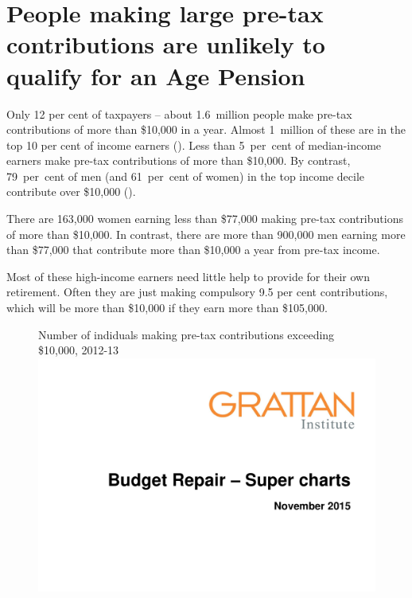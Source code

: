 \section{People making large pre-tax contributions are unlikely to qualify for an Age Pension}
Only 12 per cent of taxpayers – about 1.6~million people make pre-tax contributions of more than \$10,000 in a year. Almost 1~million of these are in the top 10 per cent of income earners (). Less than 5~per~cent of median-income earners make pre-tax contributions of more than \$10,000. By contrast, 79~per~cent of men (and 61~per~cent of women) in the top income decile contribute over \$10,000 (). 

There are 163,000 women earning less than \$77,000 making pre-tax contributions of more than \$10,000. In contrast, there are more than 900,000 men earning more than \$77,000 that contribute more than \$10,000 a year from pre-tax income.

Most of these high-income earners need little help to provide for their own retirement. Often they are just making compulsory 9.5 per cent contributions, which will be more than \$10,000 if they earn more than \$105,000.

\begin{figure}
%
{Number of indiduals making pre-tax contributions exceeding \$10,000, 2012-13}\label{fig:SUPER-4-6}
\includegraphics[width=\columnwidth,page=24]{super-atlas/PPTX.pdf}

\end{figure}

